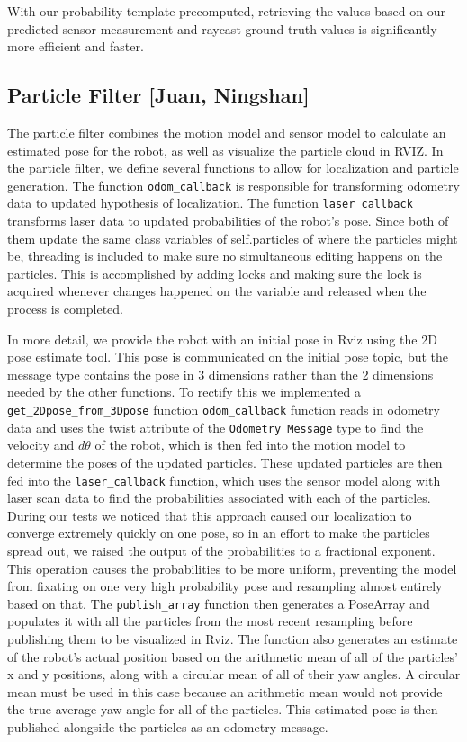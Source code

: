 \documentclass[11pt,twocolumn]{article}
\begin{document}
With our probability template precomputed, retrieving the values based on our predicted sensor measurement and raycast ground truth values is significantly more efficient and faster.

\subsection{Particle Filter [Juan, Ningshan]}
    The particle filter combines the motion model and sensor model to calculate an estimated pose for the robot, as well as visualize the particle cloud in RVIZ. In the particle filter, we define several functions to allow for localization and particle generation. The function \texttt{odom\_callback} is responsible for transforming odometry data to updated hypothesis of localization. The function \texttt{laser\_callback} transforms laser data to updated probabilities of the robot's pose. Since both of them update the same class variables of self.particles of where the particles might be, threading is included to make sure no simultaneous editing happens on the particles. This is accomplished by adding locks and making sure the lock is acquired whenever changes happened on the variable and released when the process is completed.
    
   In more detail, we provide the robot with an initial pose in Rviz using the 2D pose estimate tool. This pose is communicated on the initial pose topic, but the message type contains the pose in 3 dimensions rather than the 2 dimensions needed by the other functions. To rectify this we implemented a \texttt{get\_2Dpose\_from\_3Dpose} function \texttt{odom\_callback} function reads in odometry data and uses the twist attribute of the \texttt{Odometry Message} type to find the velocity and \( d\theta \) of the robot, which is then fed into the motion model to determine the poses of the updated particles. These updated particles are then fed into the \texttt{laser\_callback} function, which uses the sensor model along with laser scan data to find the probabilities associated with each of the particles. During our tests we noticed that this approach caused our localization to converge extremely quickly on one pose, so in an effort to make the particles spread out, we raised the output of the probabilities to a fractional exponent. This operation causes the probabilities to be more uniform, preventing the model from fixating on one very high probability pose and resampling almost entirely based on that. The \texttt{publish\_array} function then generates a PoseArray and populates it with all the particles from the most recent resampling before publishing them to be visualized in Rviz. The function also generates an estimate of the robot's actual position based on the arithmetic mean of all of the particles' x and y positions, along with a circular mean of all of their yaw angles. A circular mean must be used in this case because an arithmetic mean would not provide the true average yaw angle for all of the particles. This estimated pose is then published alongside the particles as an odometry message. 
\end{document}
